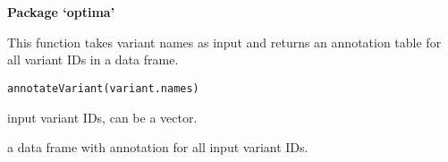 \documentclass[a4paper]{book}
\begin{document}
\chapter*{}
\begin{center}
{\textbf{\huge Package `optima'}}
\par\bigskip{\large \today}
\end{center}
\begin{description}
\raggedright{}
\item[Title]
\item[Version]
\item[Description]
\item[License]
\item[Encoding]
\item[Roxygen]
\item[RoxygenNote]
\item[Imports]
\end{description}
%
\begin{Description}\relax
This function takes variant names as input and
returns an annotation table for all variant IDs in a data frame.
\end{Description}
%
\begin{Usage}
\begin{verbatim}
annotateVariant(variant.names)
\end{verbatim}
\end{Usage}
%
\begin{Arguments}
\begin{ldescription}
\item[\code{variant.names}] input variant IDs, can be a vector.
\end{ldescription}
\end{Arguments}
%
\begin{Value}
a data frame with annotation for all input variant IDs.
\end{Value}
\end{document}
